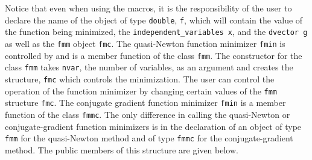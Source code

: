 \documentclass[12pt]{book}
\begin{document}
Notice that even when using the macros, it is the responsibility of the
user to declare 
the name of the object of type {\tt double}, {\tt f},
which will contain the value of the function being minimized, the 
{\tt independent\_variables x}, and the {\tt dvector g} as well
as the {\tt fmm} object {\tt fmc}.
The quasi-Newton function minimizer {\tt fmin} is 
controlled by and is a member function 
of the class {\tt fmm}. The constructor for the
class {\tt fmm} takes {\tt nvar}, the number of variables,
as an argument and creates the structure, {\tt fmc} which controls 
the minimization.  The user can control the operation of the 
function minimizer by changing certain values of the {\tt fmm}
structure {\tt fmc}.
The conjugate gradient function minimizer {\tt fmin} is
a member function of the class {\tt fmmc}.
The only difference in calling the quasi-Newton or conjugate-gradient 
function minimizers is in the declaration of an
object of type {\tt fmm} for the quasi-Newton method and
of type {\tt fmmc} for the conjugate-gradient method.
The public members of this structure are given below. 
\end{document}
